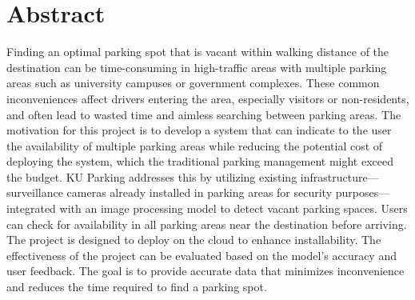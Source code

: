 \chapter*{Abstract}
\label{chap:abstract}

Finding an optimal parking spot that is vacant within walking
distance of the destination can be time-consuming in high-traffic areas
with multiple parking areas such as university campuses or government
complexes. These common inconveniences affect drivers entering the
area, especially visitors or non-residents, and often lead to wasted time
and aimless searching between parking areas. The motivation for this
project is to develop a system that can indicate to the user the availability of multiple parking areas while reducing the potential cost of deploying the system, which the traditional parking management might exceed the budget. KU Parking addresses this by utilizing existing infrastructure—surveillance cameras already installed in parking areas for security purposes—integrated with an image processing model to detect vacant
parking spaces. Users can check for availability in all parking areas near
the destination before arriving. The project is designed to deploy on the
cloud to enhance installability. The effectiveness of the project can be
evaluated based on the model’s accuracy and user feedback. The goal is to
provide accurate data that minimizes inconvenience and reduces the time
required to find a parking spot.